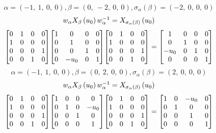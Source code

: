 \documentclass[11pt]{article}
\theoremstyle{definition}
\begin{document}
\[
\alpha = \left( -1, \  1, \  0, \  0\right), \beta = \left( 0, \  -2, \  0, \  0\right), \sigma_{\alpha}(\beta) = \left( -2, \  0, \  0, \  0\right)
\]
\[
\scaletoalign{\textwidth}{w_{\alpha} X_{\beta}\left(u_{0}\right) w_{\alpha}^{-1} = X_{\sigma_{\alpha}\left(\beta\right)}\left(u_{0}\right)}
\]
\[
\scaletoalign{\textwidth}{{\left[\begin{matrix}0 & 1 & 0 & 0\\1 & 0 & 0 & 0\\0 & 0 & 0 & 1\\0 & 0 & 1 & 0\end{matrix}\right]} {\left[\begin{matrix}1 & 0 & 0 & 0\\0 & 1 & 0 & 0\\0 & 0 & 1 & 0\\0 & - u_{0} & 0 & 1\end{matrix}\right]} {\left[\begin{matrix}0 & 1 & 0 & 0\\1 & 0 & 0 & 0\\0 & 0 & 0 & 1\\0 & 0 & 1 & 0\end{matrix}\right]} = {\left[\begin{matrix}1 & 0 & 0 & 0\\0 & 1 & 0 & 0\\- u_{0} & 0 & 1 & 0\\0 & 0 & 0 & 1\end{matrix}\right]}}
\]
\[
\alpha = \left( -1, \  1, \  0, \  0\right), \beta = \left( 0, \  2, \  0, \  0\right), \sigma_{\alpha}(\beta) = \left( 2, \  0, \  0, \  0\right)
\]
\[
\scaletoalign{\textwidth}{w_{\alpha} X_{\beta}\left(u_{0}\right) w_{\alpha}^{-1} = X_{\sigma_{\alpha}\left(\beta\right)}\left(u_{0}\right)}
\]
\[
\scaletoalign{\textwidth}{{\left[\begin{matrix}0 & 1 & 0 & 0\\1 & 0 & 0 & 0\\0 & 0 & 0 & 1\\0 & 0 & 1 & 0\end{matrix}\right]} {\left[\begin{matrix}1 & 0 & 0 & 0\\0 & 1 & 0 & - u_{0}\\0 & 0 & 1 & 0\\0 & 0 & 0 & 1\end{matrix}\right]} {\left[\begin{matrix}0 & 1 & 0 & 0\\1 & 0 & 0 & 0\\0 & 0 & 0 & 1\\0 & 0 & 1 & 0\end{matrix}\right]} = {\left[\begin{matrix}1 & 0 & - u_{0} & 0\\0 & 1 & 0 & 0\\0 & 0 & 1 & 0\\0 & 0 & 0 & 1\end{matrix}\right]}}
\]
\end{document}
